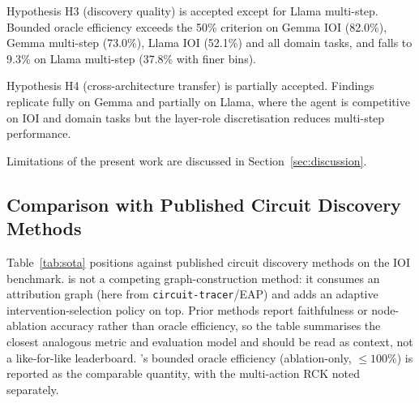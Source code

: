 Hypothesis H3 (discovery quality) is accepted except for Llama multi-step.
Bounded oracle efficiency exceeds the 50\% criterion on Gemma IOI (82.0\%),
Gemma multi-step (73.0\%), Llama IOI (52.1\%) and all domain tasks, and falls to
9.3\% on Llama multi-step (37.8\% with finer bins).

Hypothesis H4 (cross-architecture transfer) is partially accepted. Findings
replicate fully on Gemma and partially on Llama, where the agent is competitive
on IOI and domain tasks but the layer-role discretisation reduces multi-step
performance.

Limitations of the present work are discussed in Section~\ref{sec:discussion}.

\subsection{Comparison with Published Circuit Discovery Methods}
\label{sec:sota_comparison}

Table~\ref{tab:sota} positions \ACD{} against published circuit
discovery methods on the IOI benchmark.  \ACD{} is
not a competing graph-construction method: it consumes an
attribution graph (here from \texttt{circuit-tracer}/EAP) and adds an
adaptive intervention-selection policy on top.  Prior methods report
faithfulness or node-ablation accuracy rather than oracle efficiency,
so the table summarises the closest analogous metric and evaluation
model and should be read as context, not a like-for-like leaderboard.
\ACD{}'s bounded oracle efficiency
(ablation-only, $\leq 100\%$) is reported as the comparable quantity, with the
multi-action RCK noted separately.


